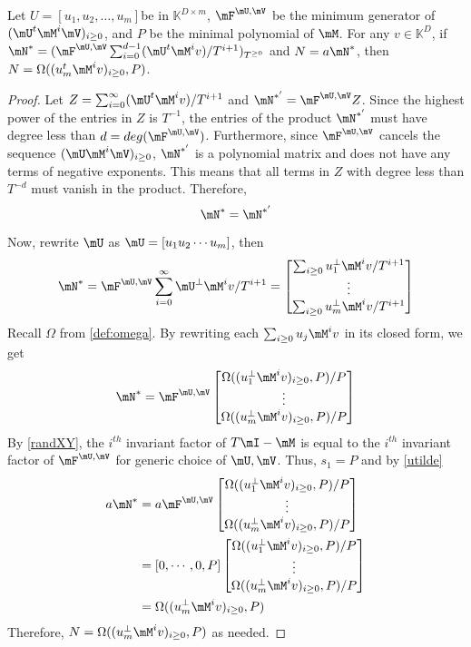 \documentclass[12pt]{article}
\def\K{\mathbb{K}}
\def\K {\ensuremath{\mathbb{K}}}
\begin{document}
\begin{theorem}
	 Let $U = [u_1,u_2,\dots,u_m]$be in $\K^{D\times m}$,
	 $\mF^{\mU,\mV}$ be the minimum generator of $(\mU^t \mM^i \mV)_{i\ge0}$,
	 and $P$ be the minimal polynomial of $\mM$. For any 
	 $v \in \K^{D}$, if\\ 
	 $\mN^* = (\mF^{\mU,\mV}\sum_{i=0}^{d-1} (\mU^t \mM^i v)/T^{i+1})_{T^{\ge0}}$ 
	 and $N = a\mN^*$,
	 then $N = \Omega((u_m^t \mM^i v)_{i\ge0},P)$.
	 \label{theorem:anyv}
\end{theorem}

\begin{proof}
	Let $Z = \sum_{i=0}^{\infty} (\mU^t\mM^iv)/T^{i+1}$ and
	$\mN^{*'} = \mF^{\mU,\mV} Z$.
	Since the highest power of the entries in 
	$Z$ is $T^{-1}$, the 
	entries of the product $\mN^{*'}$ must have degree less 
	than $d = deg(\mF^{\mU,\mV})$. Furthermore, since $\mF^{\mU,\mV}$ cancels 
	the sequence $(\mU\mM^i\mV)_{i \ge 0}$, $\mN^{*'}$ is a
	polynomial matrix and does not have any terms of negative exponents.
	This means that all terms in $Z$ with degree less than $T^{-d}$ must vanish in the
	product.
	Therefore,
	$$ \mN^* = \mN^{*'}$$
	
	Now, rewrite $\mU$ as $\mU = [u_1 u_2 \cdots u_m]$, then
	$$
	\mN^* = \mF^{\mU,\mV}
	\sum_{i=0}^{\infty} \mU^{\perp} \mM^i v / T^{i+1} =
	\begin{bmatrix}
	\sum_{i\ge 0} u_1^{\perp}\mM^iv/T^{i+1}\\
	\vdots                   \\
	\sum_{i\ge 0} u_m^{\perp}\mM^iv/T^{i+1}
	\end{bmatrix}$$
	Recall $\Omega$ from \cref{def:omega}.
	By rewriting each $\sum_{i\ge0} u_j \mM^i v$ in its closed form, we get
	$$ \mN^* = \mF^{\mU,\mV}
	\begin{bmatrix}
	\Omega( (u_1^{\perp} \mM^i v)_{i\ge 0},P) / P \\
	\vdots      \\
	\Omega((u_m^{\perp} \mM^i v)_{i\ge 0},P) / P 
	\end{bmatrix}
	$$
	By \cref{randXY}, the $i^{th}$ invariant factor of
	$T\mI - \mM$ is equal to the $i^{th}$ invariant factor of $\mF^{\mU,\mV}$ 
	for generic choice of
	$\mU,\mV$. Thus, $s_1 = P$ and by \cref{utilde}
	\begin{align*}
	a \mN^* &= a \mF^{\mU,\mV}
	\begin{bmatrix}
	\Omega((u_1^{\perp} \mM^i v)_{i\ge 0},P) / P \\
	\vdots      \\
	\Omega((u_m^{\perp} \mM^i v)_{i\ge 0},P) / P 
	\end{bmatrix}\\
	&= [0,\cdots,0,P]
	\begin{bmatrix}
	\Omega((u_1^{\perp} \mM^i v)_{i \ge 0},P) / P \\
	\vdots      \\
	\Omega((u_m^{\perp} \mM^i v)_{i\ge 0},P) / P 
	\end{bmatrix}\\
	&= \Omega((u_m^{\perp} \mM^i v)_{i\ge 0},P)
	\end{align*}
	Therefore, $N = \Omega(( u_m^{\perp} \mM^i v)_{i\ge 0},P)$ as needed.
\end{proof}
\end{document}

